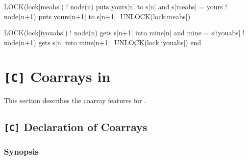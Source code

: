 \begin{itemize}
\begin{XFexample}
      LOCK(lock[meabs])   ! node(n) puts yours[n] to s[n] and 
      s[meabs] = yours    ! node(n+1) puts yours[n+1] to s[n+1].
      UNLOCK(lock[meabs])

      LOCK(lock[iyouabs])  ! node(n) gets s[n+1] into mine[n] and 
      mine = s[iyouabs]    ! node(n+1) gets s[n] into mine[n+1].
      UNLOCK(lock[iyouabs])
      end
\end{XFexample}

\end{itemize}

%
%
%

\section{{\tt [C]} Coarrays in {\XMPC}}

This section describes the coarray features for {\XMPC}.

\subsection{{\tt [C]} Declaration of Coarrays}
\label{173311_31Oct14}

\subsubsection*{Synopsis}

